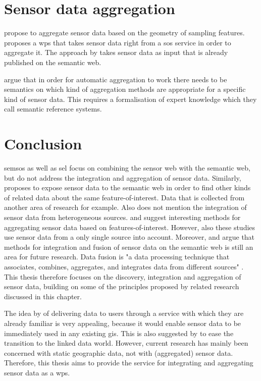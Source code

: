 \section{Sensor data aggregation}
\cite{SSW:Stasch} propose to aggregate sensor data based on the geometry of sampling features. \cite{SSW:Stasch3} proposes a \ac{wps} that takes sensor data right from a \ac{sos} service in order to aggregate it. The approach by \cite{SSW:Stasch} takes sensor data as input that is already published on the semantic web.

\cite{SSW:Stasch4} argue that in order for automatic aggregation to work there needs to be semantics on which kind of aggregation methods are appropriate for a specific kind of sensor data. This requires a formalisation of expert knowledge which they call semantic reference systems. 

\section{Conclusion}
\ac{semsos} \citep{SSW:Henson, SSW:Pschorr} as well as \ac{sel} \citep{SSW:Janowicz} focus on combining the sensor web with the semantic web, but do not address the integration and aggregation of sensor data. Similarly, \cite{SSW:Atkinson} proposes to expose sensor data to the semantic web in order to find other kinds of related data about the same feature-of-interest. Data that is collected from another area of research for example. Also \cite{SSW:Atkinson} does not mention the integration of sensor data from heterogeneous sources. \cite{SSW:Stasch} and \cite{SSW:Stasch3} suggest interesting methods for aggregating sensor data based on features-of-interest. However, also these studies use sensor data from a only single source into account. Moreover, \cite{SSW:Corcho} and \cite{SSW:Ji} argue that methods for integration and fusion of sensor data on the semantic web is still an area for future research. Data fusion is "a data processing technique that associates, combines, aggregates, and integrates data from different sources" \cite[p. 2]{SSW:Wang2}. This thesis therefore focuses on the discovery, integration and aggregation of sensor data, building on some of the principles proposed by related research discussed in this chapter.  

The idea by \cite{SW:Jones} of delivering data to users through a service with which they are already familiar is very appealing, because it would enable sensor data to be immediately used in any existing \ac{gis}. This is also suggested by \cite{SSW:Atkinson} to ease the transition to the linked data world. However, current research has mainly been concerned with static geographic data, not with (aggregated) sensor data. Therefore, this thesis aims to provide the service for integrating and aggregating sensor data as a \ac{wps}.
